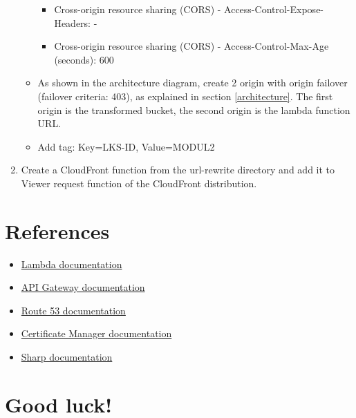\documentclass{article}
\begin{document}
\begin{enumerate}
\begin{itemize}
\begin{itemize}
      \item Cross-origin resource sharing (CORS) - Access-Control-Expose-Headers: -
      \item Cross-origin resource sharing (CORS) - Access-Control-Max-Age (seconds): 600
    \end{itemize}
    \item As shown in the architecture diagram, create 2 origin with origin failover (failover criteria: 403), as explained in section \ref{architecture}. The first origin is the transformed bucket, the second origin is the lambda function URL.
    \item Add tag: Key=LKS-ID, Value=MODUL2
  \end{itemize}
  \item Create a CloudFront function from the url-rewrite directory and add it to Viewer request function of the CloudFront distribution.
\end{enumerate}
\section{References}\label{references}
\begin{itemize}
\item \href{https://docs.aws.amazon.com/lambda/latest/dg/welcome.html}{Lambda documentation}
\item \href{https://docs.aws.amazon.com/apigateway/latest/developerguide/welcome.html}{API Gateway documentation}
\item \href{https://docs.aws.amazon.com/Route53/latest/DeveloperGuide/Welcome.html}{Route 53 documentation}
\item \href{https://docs.aws.amazon.com/acm/latest/userguide/acm-overview.html}{Certificate Manager documentation}
\item \href{https://sharp.pixelplumbing.com/}{Sharp documentation}
\end{itemize}

\section*{Good luck!}
\end{document}
